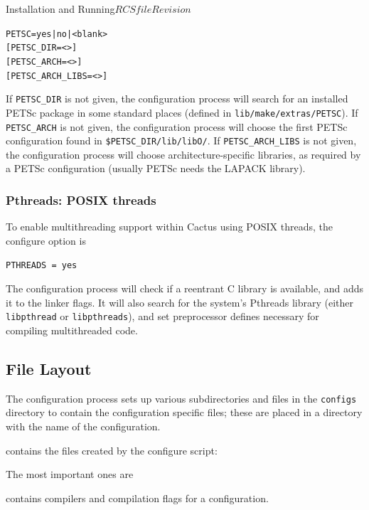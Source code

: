 \begin{cactuspart}{Installation and Running}{$RCSfile$}{$Revision$}
\begin{alltt}
PETSC = yes | no | <blank>
[ PETSC\_DIR = <> ]
[ PETSC\_ARCH = <> ]
[ PETSC\_ARCH\_LIBS = <> ]
\end{alltt}

If \texttt{PETSC\_DIR} is not given, the configuration process will search for an
installed PETSc package in some standard places (defined in
\texttt{lib/make/extras/PETSC}).
If \texttt{PETSC\_ARCH} is not given, the configuration process will choose the
first PETSc configuration found in \texttt{\$PETSC\_DIR/lib/libO/}.
If \texttt{PETSC\_ARCH\_LIBS} is not given, the configuration process will choose
architecture-specific libraries, as required by a PETSc configuration (usually
PETSc needs the LAPACK library).


\subsubsection{Pthreads: POSIX threads}

To enable multithreading support within Cactus using POSIX threads,
the configure option is

\texttt{PTHREADS = yes}

The configuration process will check if a reentrant C library is available,
and adds it to the linker flags. It will also search for the system's Pthreads
library (either \texttt{libpthread} or \texttt{libpthreads}), and set
preprocessor defines necessary for compiling multithreaded code.


\subsection{File Layout}

The configuration process sets up various subdirectories and files in the
\texttt{configs} directory to contain the configuration specific files; these
are placed in a directory with the name of the configuration.

\begin{Lentry}

\item [\texttt{config-data}] contains the files created by the configure
script:

The most important ones are

\begin{Lentry}

\item [\texttt{make.config.defn}]
contains compilers and compilation flags for a configuration.


\end{Lentry}
\end{Lentry}
\end{cactuspart}
